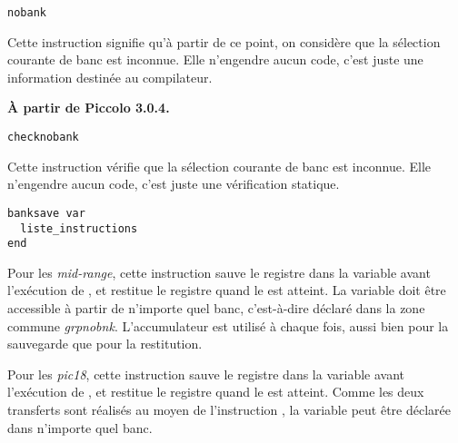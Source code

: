 \begin{lstlisting}[language=piccolo]
nobank
\end{lstlisting}

Cette instruction signifie qu'à partir de ce point, on considère que la sélection courante de banc est inconnue. Elle n'engendre aucun code, c'est juste une information destinée au compilateur.






\textbf{À partir de Piccolo 3.0.4.}

\begin{lstlisting}[language=piccolo]
checknobank
\end{lstlisting}

Cette instruction vérifie que la sélection courante de banc est inconnue. Elle n'engendre aucun code, c'est juste une vérification statique.






\begin{lstlisting}[language=piccolo]
banksave var
  liste_instructions
end
\end{lstlisting}

Pour les \emph{mid-range}, cette instruction sauve le registre  dans la variable  avant l'exécution de , et restitue le registre  quand le  est atteint. La variable  doit être accessible à partir de n'importe quel banc, c'est-à-dire déclaré dans la zone commune \emph{grpnobnk}. L'accumulateur  est utilisé à chaque fois, aussi bien pour la sauvegarde que pour la restitution.

Pour les \emph{pic18}, cette instruction sauve le registre  dans la variable  avant l'exécution de , et restitue le registre  quand le  est atteint. Comme les deux transferts sont réalisés au moyen de l'instruction , la variable  peut être déclarée dans n'importe quel banc.




